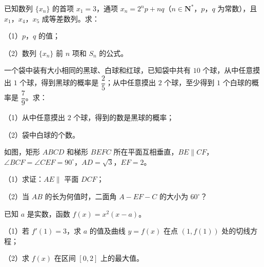 \begin{question}
已知数列 $\{x_n\}$ 的首项 $x_1=3$，通项 $x_n=2^np+nq$（$n\in\mathbf N^*$，$p$，$q$ 为常数），且 $x_1$，$x_4$，$x_5$ 成等差数列。求：

（1）$p$，$q$ 的值；

（2）数列 $\{x_n\}$ 前 $n$ 项和 $S_n$ 的公式。

\end{question}
\begin{question}
一个袋中装有大小相同的黑球、白球和红球，已知袋中共有 $10$ 个球，从中任意摸出 $1$ 个球，得到黑球的概率是 $\dfrac25$；从中任意摸出 $2$ 个球，至少得到 $1$ 个白球的概率是 $\dfrac79$。求：

（1）从中任意摸出 $2$ 个球，得到的数是黑球的概率；

（2）袋中白球的个数。

\Needspace{0.4\textheight}
\end{question}
\begingroup
\renewenvironment{question}{\Needspace{0.5\textheight}}{}
\begin{question}
如图，矩形 $ABCD$ 和梯形 $BEFC$ 所在平面互相垂直，$BE\parallel CF$，$\angle BCF=\angle CEF=90^\circ$，$AD=\sqrt3$，$EF=2$。

（1）求证：$AE\parallel$ 平面 $DCF$；

（2）当 $AB$ 的长为何值时，二面角 $A-EF-C$ 的大小为 $60^\circ$？
\nopagebreak[4]
\begin{center}\end{center}
\nopagebreak[4]
\end{question}
\endgroup
\begin{question}
已知 $a$ 是实数，函数 $f(x)=x^2(x-a)$。

（1）若 $f'(1)=3$，求 $a$ 的值及曲线 $y=f(x)$ 在点 $(1,f(1))$ 处的切线方程；

（2）求 $f(x)$ 在区间 $[0,2]$ 上的最大值。

\end{question}